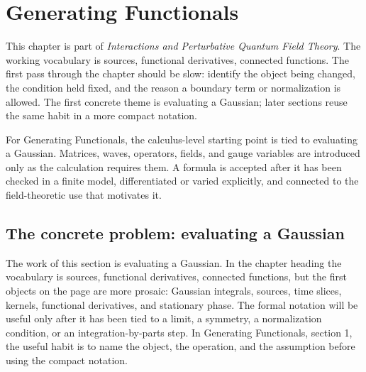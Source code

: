 \chapter{Generating Functionals}


This chapter is part of \emph{Interactions and Perturbative Quantum Field Theory}.  The working vocabulary is sources, functional derivatives, connected functions.  The first pass through the chapter should be slow: identify the object being changed, the condition held fixed, and the reason a boundary term or normalization is allowed.  The first concrete theme is evaluating a Gaussian; later sections reuse the same habit in a more compact notation.

For Generating Functionals, the calculus-level starting point is tied to evaluating a Gaussian.  Matrices, waves, operators, fields, and gauge variables are introduced only as the calculation requires them.  A formula is accepted after it has been checked in a finite model, differentiated or varied explicitly, and connected to the field-theoretic use that motivates it.

\section{The concrete problem: evaluating a Gaussian}













The work of this section is evaluating a Gaussian.  In the chapter heading the vocabulary is sources, functional derivatives, connected functions, but the first objects on the page are more prosaic: Gaussian integrals, sources, time slices, kernels, functional derivatives, and stationary phase.  The formal notation will be useful only after it has been tied to a limit, a symmetry, a normalization condition, or an integration-by-parts step.  In Generating Functionals, section 1, the useful habit is to name the object, the operation, and the assumption before using the compact notation.

